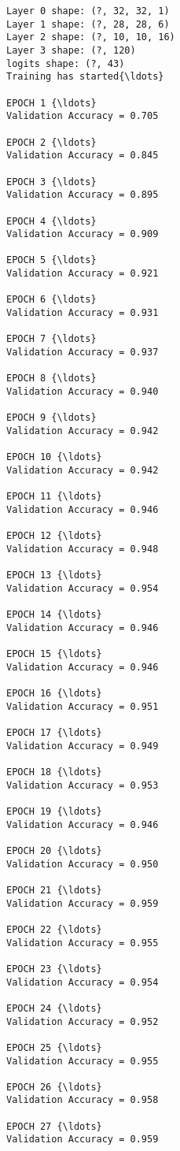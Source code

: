 \documentclass[11pt]{article}
\begin{document}
    \begin{Verbatim}[commandchars=\\\{\}]
Layer 0 shape: (?, 32, 32, 1)
Layer 1 shape: (?, 28, 28, 6)
Layer 2 shape: (?, 10, 10, 16)
Layer 3 shape: (?, 120)
logits shape: (?, 43)
Training has started{\ldots}

EPOCH 1 {\ldots}
Validation Accuracy = 0.705

EPOCH 2 {\ldots}
Validation Accuracy = 0.845

EPOCH 3 {\ldots}
Validation Accuracy = 0.895

EPOCH 4 {\ldots}
Validation Accuracy = 0.909

EPOCH 5 {\ldots}
Validation Accuracy = 0.921

EPOCH 6 {\ldots}
Validation Accuracy = 0.931

EPOCH 7 {\ldots}
Validation Accuracy = 0.937

EPOCH 8 {\ldots}
Validation Accuracy = 0.940

EPOCH 9 {\ldots}
Validation Accuracy = 0.942

EPOCH 10 {\ldots}
Validation Accuracy = 0.942

EPOCH 11 {\ldots}
Validation Accuracy = 0.946

EPOCH 12 {\ldots}
Validation Accuracy = 0.948

EPOCH 13 {\ldots}
Validation Accuracy = 0.954

EPOCH 14 {\ldots}
Validation Accuracy = 0.946

EPOCH 15 {\ldots}
Validation Accuracy = 0.946

EPOCH 16 {\ldots}
Validation Accuracy = 0.951

EPOCH 17 {\ldots}
Validation Accuracy = 0.949

EPOCH 18 {\ldots}
Validation Accuracy = 0.953

EPOCH 19 {\ldots}
Validation Accuracy = 0.946

EPOCH 20 {\ldots}
Validation Accuracy = 0.950

EPOCH 21 {\ldots}
Validation Accuracy = 0.959

EPOCH 22 {\ldots}
Validation Accuracy = 0.955

EPOCH 23 {\ldots}
Validation Accuracy = 0.954

EPOCH 24 {\ldots}
Validation Accuracy = 0.952

EPOCH 25 {\ldots}
Validation Accuracy = 0.955

EPOCH 26 {\ldots}
Validation Accuracy = 0.958

EPOCH 27 {\ldots}
Validation Accuracy = 0.959


\end{Verbatim}
\end{document}
